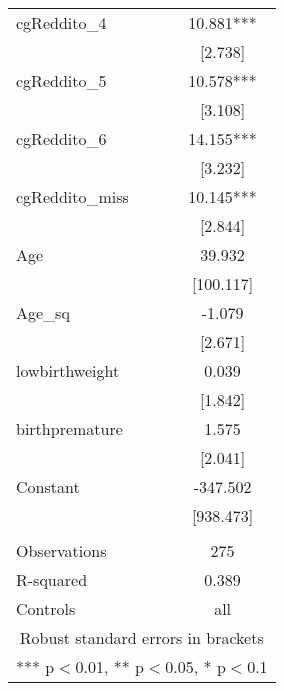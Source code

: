 \documentclass[]{article}
\begin{document}
\begin{tabular}{lc}
cgReddito\_4 & 10.881*** \\
 & [2.738] \\
cgReddito\_5 & 10.578*** \\
 & [3.108] \\
cgReddito\_6 & 14.155*** \\
 & [3.232] \\
cgReddito\_miss & 10.145*** \\
 & [2.844] \\
Age & 39.932 \\
 & [100.117] \\
Age\_sq & -1.079 \\
 & [2.671] \\
lowbirthweight & 0.039 \\
 & [1.842] \\
birthpremature & 1.575 \\
 & [2.041] \\
Constant & -347.502 \\
 & [938.473] \\
 &  \\
Observations & 275 \\
R-squared & 0.389 \\
 Controls & all \\ \hline
\multicolumn{2}{c}{ Robust standard errors in brackets} \\
\multicolumn{2}{c}{ *** p$<$0.01, ** p$<$0.05, * p$<$0.1} \\
\end{tabular}
\end{document}
